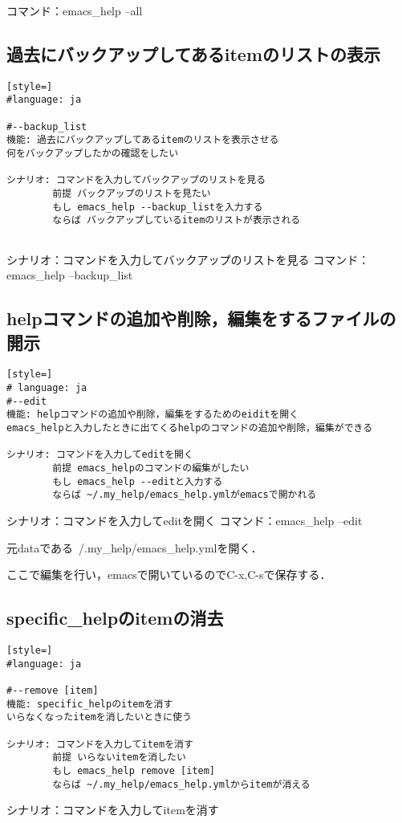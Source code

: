コマンド：emacs\_help --all

\subsection{過去にバックアップしてあるitemのリストの表示}\begin{lstlisting}[style=]
#language: ja

#--backup_list
機能: 過去にバックアップしてあるitemのリストを表示させる
何をバックアップしたかの確認をしたい

シナリオ: コマンドを入力してバックアップのリストを見る
        前提 バックアップのリストを見たい
        もし emacs_help --backup_listを入力する
        ならば バックアップしているitemのリストが表示される
        
\end{lstlisting}
シナリオ：コマンドを入力してバックアップのリストを見る
コマンド：emacs\_help --backup\_list

\subsection{helpコマンドの追加や削除，編集をするファイルの開示}\begin{lstlisting}[style=]
# language: ja
#--edit
機能: helpコマンドの追加や削除，編集をするためのeiditを開く
emacs_helpと入力したときに出てくるhelpのコマンドの追加や削除，編集ができる

シナリオ: コマンドを入力してeditを開く
        前提 emacs_helpのコマンドの編集がしたい
        もし emacs_help --editと入力する
        ならば ~/.my_help/emacs_help.ymlがemacsで開かれる
\end{lstlisting}
シナリオ：コマンドを入力してeditを開く
コマンド：emacs\_help --edit

元dataである~/.my\_help/emacs\_help.ymlを開く．

ここで編集を行い，emacsで開いているのでC-x,C-sで保存する．

\subsection{specific\_helpのitemの消去}\begin{lstlisting}[style=]
#language: ja

#--remove [item]
機能: specific_helpのitemを消す
いらなくなったitemを消したいときに使う

シナリオ: コマンドを入力してitemを消す
        前提 いらないitemを消したい
        もし emacs_help remove [item]
        ならば ~/.my_help/emacs_help.ymlからitemが消える

\end{lstlisting}
シナリオ：コマンドを入力してitemを消す

